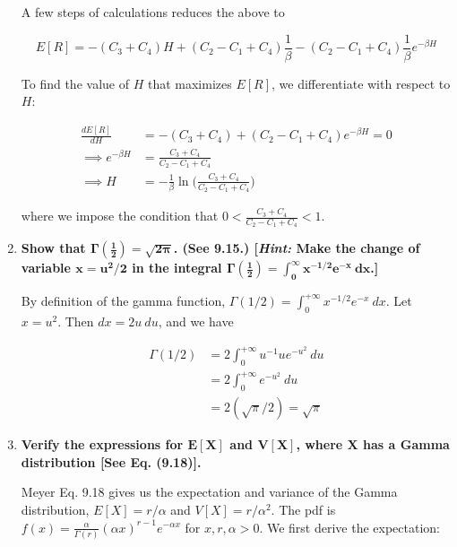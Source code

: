 \documentclass[10pt, oneside]{article}   	%
\theoremstyle{definition}
\begin{document}
\begin{enumerate}[label=9.\arabic*]
A few steps of calculations reduces the above to

\[ E[R] = -(C_3 + C_4) H + (C_2 - C_1 + C_4) \frac{1}{\beta} - (C_2 - C_1 + C_4) \frac{1}{\beta} e^{-\beta H} \]

To find the value of $H$ that maximizes $E[R]$, we differentiate with respect to $H$:

\begin{align*}
\frac{d E[R]}{dH} &= - (C_3 + C_4) + (C_2 - C_1 + C_4) e^{-\beta H} = 0 \\
\implies e^{-\beta H} &= \frac{C_3 + C_4}{C_2 - C_1 + C_4} \\
\implies H &= \boxed{ -\frac{1}{\beta} \ln \bigg( \frac{C_3 + C_4}{C_2 - C_1 + C_4} \bigg) }
\end{align*}

where we impose the condition that $0 < \frac{C_3 + C_4}{C_2 - C_1 + C_4} < 1$.

\item  \begin{tcolorbox}[
  colback=Cerulean!5!white,
  colframe=Cerulean!75!black]
\textbf{Show that $\bm{\Gamma (\frac{1}{2}) = \sqrt{2 \pi}}$. (See 9.15.) [\textit{Hint:} Make the change of variable $\bm{x = u^2 / 2}$ in the integral $\bm{\Gamma(\frac{1}{2}) = \int^\infty_0 x^{-1/2} e^{-x} \ dx}$.]}
\end{tcolorbox}

By definition of the gamma function, $\Gamma (1/2) = \int^{+\infty}_0 x^{-1/2} e^{-x} \ dx$. Let $x = u^2$. Then $dx = 2u \ du$, and we have

\begin{align*}
\Gamma(1/2) &= 2 \int^{+\infty}_0 u^{-1} u e^{-u^2} \ du \\
&= 2 \int^{+\infty}_0 e^{-u^2} \ du \\
&= 2 (\sqrt{\pi} / 2) = \boxed{\sqrt{\pi}}
\end{align*}

\newpage
\item  \begin{tcolorbox}[
  colback=Cerulean!5!white,
  colframe=Cerulean!75!black]
\textbf{Verify the expressions for $\bm{E[X]}$ and $\bm{V[X]}$, where $\bm{X}$ has a Gamma distribution [See Eq. (9.18)].}
\end{tcolorbox}

Meyer Eq. 9.18 gives us the expectation and variance of the Gamma distribution, $E[X] = r/\alpha$ and $V[X] = r/\alpha^2$. The pdf is $f(x) = \frac{\alpha}{\Gamma(r)} (\alpha x)^{r-1} e^{-\alpha x}$ for $x, r, \alpha > 0$. We first derive the expectation:


\end{enumerate}
\end{document}
